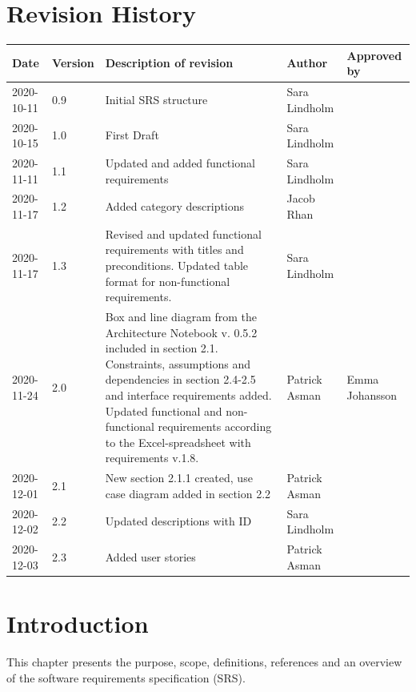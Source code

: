 \documentclass{scrreprt}
\begin{document}
\chapter*{Revision History}
\begin{center}
\begin{tabular}{|p{}|p{}|p{4.6cm}|p{2.5cm}|p{2.5cm}|}
 \hline
 \textbf{Date} & \textbf{Version} & \textbf{Description of revision} & \textbf{Author} & \textbf{Approved by} \\ 
 \hline
 2020-10-11 & 0.9 & Initial SRS structure & Sara Lindholm & \\
 \hline
 2020-10-15 & 1.0 & First Draft & Sara Lindholm & \\ 
 \hline
 2020-11-11 & 1.1 & Updated and added functional requirements & Sara Lindholm & \\
 \hline
 2020-11-17 & 1.2 & Added category descriptions & Jacob Rhan & \\
 \hline
 2020-11-17 & 1.3 & Revised and updated functional requirements with titles and preconditions. Updated table format for non-functional requirements. & Sara Lindholm & \\
 \hline 
 2020-11-24 & 2.0 & Box and line diagram from the Architecture Notebook v. 0.5.2 included in section 2.1. Constraints, assumptions and dependencies in section 2.4-2.5 and interface requirements added. Updated functional and non-functional requirements according to the Excel-spreadsheet with requirements v.1.8. & Patrick Asman & Emma Johansson \\
 \hline
 2020-12-01 & 2.1 & New section 2.1.1 created, use case diagram added in section 2.2 & Patrick Asman & \\
 \hline 
 2020-12-02 & 2.2 & Updated descriptions with ID & Sara Lindholm & \\
 \hline 
 2020-12-03 & 2.3 & Added user stories & Patrick Asman & \\ 
 \hline 
\end{tabular}
\end{center}

\tableofcontents

\chapter{Introduction}
This chapter presents the purpose, scope, definitions, references and an overview of the software requirements specification (SRS). 
\end{document}
